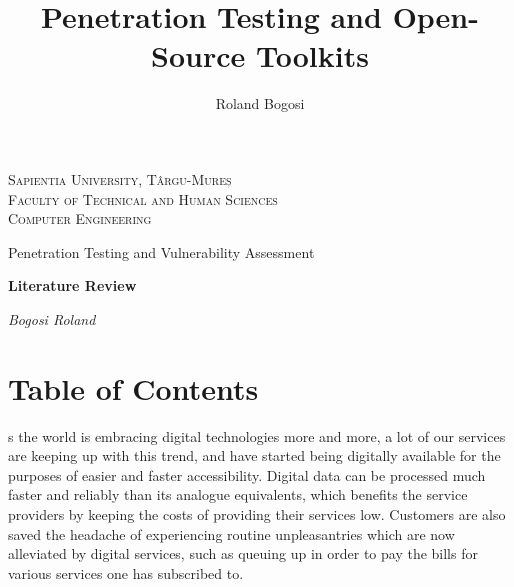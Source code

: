 \documentclass[a4paper,12pt]{article}
\author{Roland Bogosi}
\title{Penetration Testing and Open-Source Toolkits}
\begin{document}
\thispagestyle{empty}

	\begin{center}
		\textsc{\Large Sapientia University, Târgu-Mureș}\\
		\textsc{\Large Faculty of Technical and Human Sciences}\\
		\vspace{1mm}
		\textsc{\Large Computer Engineering}\\
		
		\vspace{3.4in}
		
		{\LARGE Penetration Testing and Vulnerability Assessment}
		
		\vspace{0.5in}
		
		\textbf{\Large Literature Review}
		
		\vspace{3.5in}
	\end{center}
	
	\begin{flushright}
		{\Large \textit{Bogosi Roland}}
	\end{flushright}

\newpage
\thispagestyle{empty}
\section*{Table of Contents}

	\begingroup
	\renewcommand{\section}[2]{}
	\hypersetup{linkcolor=blue}
	\setlength{\parskip}{0em}
	\tableofcontents
	\endgroup

\newpage
\section{Introduction}

	As the world is embracing digital technologies more and more, a lot of our services are keeping up with this trend, and have started being digitally available for the purposes of easier and faster accessibility. Digital data can be processed much faster and reliably than its analogue equivalents, which benefits the service providers by keeping the costs of providing their services low. Customers are also saved the headache of experiencing routine unpleasantries which are now alleviated by digital services, such as queuing up in order to pay the bills for various services one has subscribed to.
	
\end{document}
